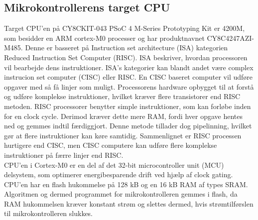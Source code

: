 \subsection{Mikrokontrollerens target CPU}
Target CPU'en på CY8CKIT-043 PSoC 4 M-Series Prototyping Kit er 4200M, som besidder en ARM cortex-M0 processer og har produktnavnet CY8C4247AZI-M485. Denne er basseret på Instruction set architecture (ISA) kategorien Reduced Instruction Set Computer (RISC). ISA beskriver, hvordan processoren vil bearbejde dens instruktioner. ISA's kategorier kan blandt andet være complex instrucion set computer (CISC) eller RISC. En CISC baseret computer vil udføre opgaver med så få linjer som muligt. Processorens hardware opbygget til at forstå og udføre komplekse instruktioner, hvilket kræver flere transistorer end RISC metoden. RISC processorer benytter simple instruktioner, som kan forløbe inden for en clock cycle. Derimod kræver dette mere RAM, fordi hver opgave hentes ned og gemmes indtil færdiggjort. Denne metode tillader dog pipelinning, hvilket gør at flere instruktioner kan køre samtidig. Sammenlignet er RISC processen hurtigere end CISC, men CISC computere kan udføre flere komplekse instruktioner på færre linjer end RISC. \citep{CYPRESS2016Cortexm0,Semiconductor20164200M,Yadav2016}\\
CPU'en i Cortex-M0 er en del af det 32-bit microcontroller unit (MCU) delsystem, som optimerer energibesparende drift ved hjælp af clock gating. %
CPU'en har en flash hukommelse på 128 kB og en 16 kB RAM af types SRAM. Algoritmen og dermed programmet for mikrokontrolleren gemmes i flash, da RAM hukommelsen kræver konstant strøm og slettes dermed, hvis strømtilførslen til mikrokontrolleren slukkes. \citep{Semiconductor20164200M}

